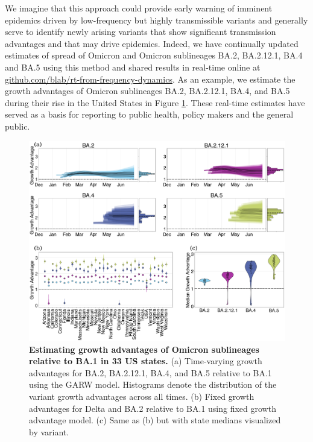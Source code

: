 We imagine that this approach could provide early warning of imminent epidemics driven by low-frequency but highly transmissible variants and generally serve to identify newly arising variants that show significant transmission advantages and that may drive epidemics.
Indeed, we have continually updated estimates of spread of Omicron and Omicron sublineages BA.2, BA.2.12.1, BA.4 and BA.5 using this method and shared results in real-time online at \href{https://github.com/blab/rt-from-frequency-dynamics/}{github.com/blab/rt-from-frequency-dynamics}.
As an example, we estimate the growth advantages of Omicron sublineages BA.2, BA.2.12.1, BA.4, and BA.5 during their rise in the United States in Figure \ref{fig:omicron_growth_advantages}.
These real-time estimates have served as a basis for reporting to public health, policy makers and the general public.

\begin{figure}[h!]
  \centering
  \includegraphics[width=\linewidth]{figs/omicron_growth_advantage.png}
  \caption{\textbf{Estimating growth advantages of Omicron sublineages relative to BA.1 in 33 US states.}
    (a) Time-varying growth advantages for BA.2, BA.2.12.1, BA.4, and BA.5 relative to BA.1 using the GARW model.
    Histograms denote the distribution of the variant growth advantages across all times.
    (b) Fixed growth advantages for Delta and BA.2 relative to BA.1 using fixed growth advantage model.
    (c) Same as (b) but with state medians visualized by variant.
  }
  \label{fig:omicron_growth_advantages}
\end{figure}

